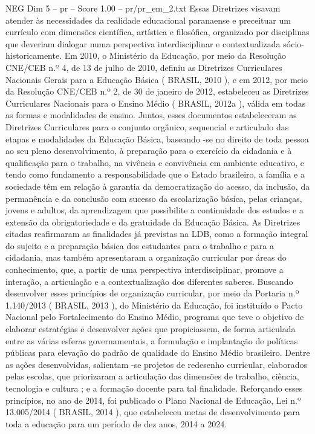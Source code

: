 \begin{textsample}{NEG Dim 5 – pr – Score 1.00 – pr/pr\_em\_2.txt}
Essas Diretrizes visavam atender às necessidades da realidade educacional paranaense e preceituar um currículo com dimensões científica, artística e filosófica, organizado por disciplinas que deveriam dialogar numa perspectiva interdisciplinar e contextualizada sócio-historicamente.
Em 2010, o Ministério da Educação, por meio da Resolução CNE/CEB n.º 4, de 13 de julho de 2010, definiu as Diretrizes Curriculares Nacionais Gerais para a Educação Básica ( BRASIL, 2010 ), e em 2012, por meio da Resolução CNE/CEB n.º 2, de 30 de janeiro de 2012, estabeleceu as Diretrizes Curriculares Nacionais para o Ensino Médio ( BRASIL, 2012a ), válida em todas as formas e modalidades de ensino.
Juntos, esses documentos estabeleceram as Diretrizes Curriculares para o conjunto orgânico, sequencial e articulado das etapas e modalidades da Educação Básica, baseando -se no direito de toda pessoa ao seu pleno desenvolvimento, à preparação para o exercício da cidadania e à qualificação para o trabalho, na vivência e convivência em ambiente educativo, e tendo como fundamento a responsabilidade que o Estado brasileiro, a família e a sociedade têm em relação à garantia da democratização do acesso, da inclusão, da permanência e da conclusão com sucesso da escolarização básica, pelas crianças, jovens e adultos, da aprendizagem que possibilite a continuidade dos estudos e a extensão da obrigatoriedade e da gratuidade da Educação Básica.
As Diretrizes citadas reafirmaram as finalidades já previstas na LDB, como a formação integral do sujeito e a preparação básica dos estudantes para o trabalho e para a cidadania, mas também apresentaram a organização curricular por áreas do conhecimento, que, a partir de uma perspectiva interdisciplinar, promove a interação, a articulação e a contextualização dos diferentes saberes.
Buscando desenvolver esses princípios de organização curricular, por meio da Portaria n.º 1.140/2013 ( BRASIL, 2013 ), do Ministério da Educação, foi instituído o Pacto Nacional pelo Fortalecimento do Ensino Médio, programa que teve o objetivo de elaborar estratégias e desenvolver ações que propiciassem, de forma articulada entre as várias esferas governamentais, a formulação e implantação de políticas públicas para elevação do padrão de qualidade do Ensino Médio brasileiro.
Dentre as ações desenvolvidas, salientam -se projetos de redesenho curricular, elaborados pelas escolas, que priorizaram a articulação das dimensões de trabalho, ciência, tecnologia e cultura ; e a formação docente para tal finalidade.
Reforçando esses princípios, no ano de 2014, foi publicado o Plano Nacional de Educação, Lei n.º 13.005/2014 ( BRASIL, 2014 ), que estabeleceu metas de desenvolvimento para toda a educação para um período de dez anos, 2014 a 2024.

\end{textsample}
